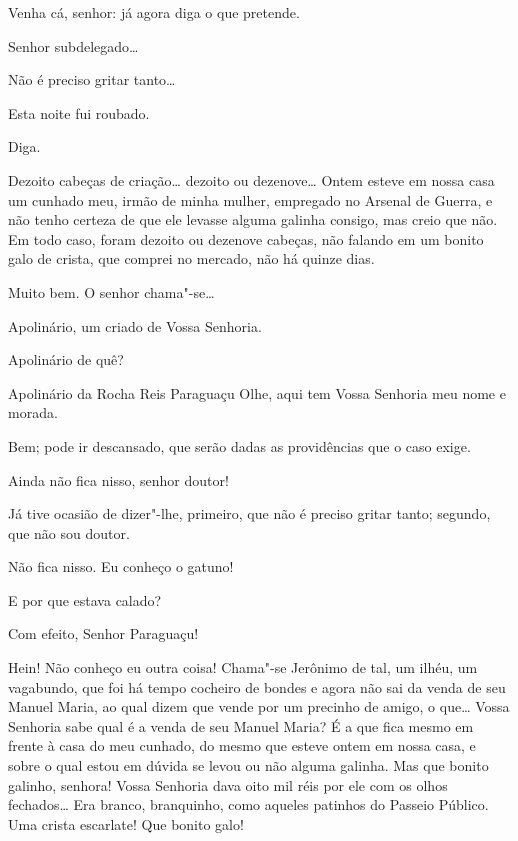  Venha cá, senhor: já agora diga o que pretende.

   Senhor subdelegado\ldots{}

 Não é preciso gritar tanto\ldots{}

 Esta noite fui roubado.

 Diga.

 Dezoito cabeças de criação\ldots{} dezoito ou dezenove\ldots{} Ontem
esteve em nossa casa um cunhado
meu, irmão de minha mulher, empregado no Arsenal de Guerra, e não tenho
certeza de que ele levasse alguma
galinha consigo, mas creio que não. Em todo caso, foram dezoito ou
dezenove cabeças, não falando em um
bonito galo de crista, que comprei no mercado, não há quinze dias.

 Muito bem. O senhor chama"-se\ldots{}

 Apolinário, um criado de Vossa Senhoria.

 Apolinário de quê?

 Apolinário da Rocha Reis Paraguaçu  Olhe, aqui tem Vossa Senhoria meu
nome e morada.

 Bem; pode ir descansado, que serão dadas as providências que o
caso exige.

  Ainda não fica nisso,
senhor doutor!

 Já tive ocasião de dizer"-lhe, primeiro, que não é preciso
gritar tanto; segundo, que não sou doutor.

  Não fica
nisso. Eu conheço o gatuno!

 E por que estava calado?

  Com efeito, Senhor
Paraguaçu!

  Hein!  Não conheço eu outra coisa!
Chama"-se Jerônimo de tal, um ilhéu, um vagabundo, que foi há tempo
cocheiro de bondes e agora não sai da
venda de seu Manuel Maria, ao qual dizem que vende por um precinho de
amigo, o que\ldots{} 
Vossa Senhoria sabe qual é a venda de seu Manuel Maria? É a que fica
mesmo em frente à casa do meu
cunhado, do mesmo que esteve ontem em nossa casa, e sobre o qual estou
em dúvida se levou ou não alguma
galinha.  Mas que bonito galinho, senhora! Vossa
Senhoria dava oito mil réis por ele com os olhos
fechados\ldots{} Era branco, branquinho, como aqueles patinhos do Passeio
Público. Uma crista escarlate! Que
bonito galo!

